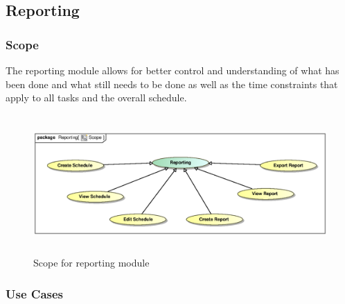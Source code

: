 \subsection{Reporting}

\subsubsection{Scope}
\par{The reporting module allows for better control and understanding of what has been done and what still needs to be done as well as the time constraints that apply to all tasks and the overall schedule.}

\begin{figure}[h]
\includegraphics[height=200px, width=500px]{epsImages/Reporting/ReportScope.eps}
\caption{Scope for reporting module}
\end{figure}

\subsubsection{Use Cases}

